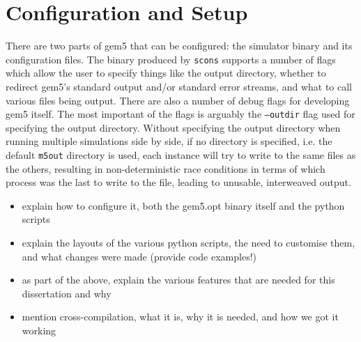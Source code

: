 \section{Configuration and Setup}
There are two parts of gem5 that can be configured: the simulator binary and 
its configuration files. The binary produced by \texttt{scons} supports a 
number of flags which allow the user to specify things like the output 
directory, whether to redirect gem5's standard output and/or standard error 
streams, and what to call various files being output. There are also a number 
of debug flags for developing gem5 itself. The most important of the flags is 
arguably the \texttt{--outdir} flag used for specifying the output directory. 
Without specifying the output directory when running multiple simulations side 
by side, if no directory is specified, i.e. the default \texttt{m5out} 
directory is used, each instance will try to write to the same files as the 
others, resulting in non-deterministic race conditions in terms of which 
process was the last to write to the file, leading to unusable, interweaved 
output.

\begin{itemize}
    \item explain how to configure it, both the gem5.opt binary itself and the
          python scripts
    \item explain the layouts of the various python scripts, the need to
          customise them, and what changes were made (provide code examples!)
    \item as part of the above, explain the various features that are needed for
          this dissertation and why
    \item mention cross-compilation, what it is, why it is needed, and how we
          got it working
\end{itemize}